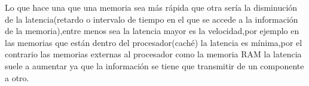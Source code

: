 \documentclass{article}
\begin{document}
Lo que hace una que una memoria sea más rápida que otra sería la disminución de la latencia(retardo o intervalo de tiempo en el que se  accede a la información de la memoria),entre menos sea la latencia mayor es la velocidad,por ejemplo en las memorias que están dentro del procesador(caché) la latencia es mínima,por el contrario las memorias externas al  procesador como la memoria RAM  la latencia suele a aumentar ya que la información se tiene que transmitir de un componente a otro. 









\newpage
    




\end{document}
